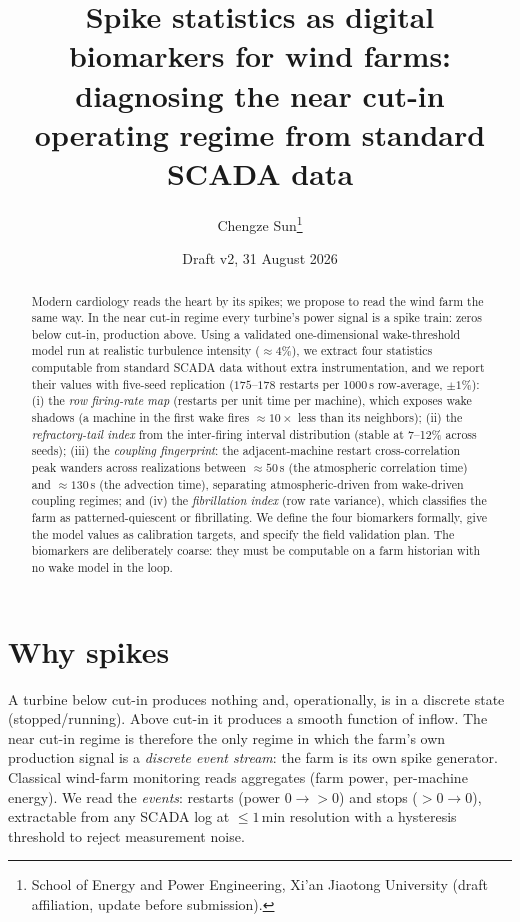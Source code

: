 \documentclass[11pt]{article}
\title{Spike statistics as digital biomarkers for wind farms:
diagnosing the near cut-in operating regime from standard SCADA data}
\author{Chengze Sun\thanks{School of Energy and Power Engineering, Xi'an Jiaotong University (draft affiliation, update before submission).}}
\date{Draft v2, 31 August 2026}
\begin{document}
\maketitle

\begin{abstract}
Modern cardiology reads the heart by its spikes; we propose to read the wind farm the same
way. In the near cut-in regime every turbine's power signal is a spike train: zeros below
cut-in, production above. Using a validated one-dimensional wake-threshold model run at
realistic turbulence intensity ($\approx 4\%$), we extract four statistics computable from
standard SCADA data without extra instrumentation, and we report their values with
five-seed replication ($175$--$178$ restarts per 1000\,s row-average, $\pm 1\%$):
(i) the \emph{row firing-rate map} (restarts per unit time per machine), which exposes wake
shadows (a machine in the first wake fires $\approx 10\times$ less than its neighbors);
(ii) the \emph{refractory-tail index} from the inter-firing interval distribution (stable
at 7--12\% across seeds); (iii) the \emph{coupling fingerprint}: the adjacent-machine restart
cross-correlation peak wanders across realizations between $\approx 50$\,s (the atmospheric
correlation time) and $\approx 130$\,s (the advection time), separating atmospheric-driven
from wake-driven coupling regimes; and (iv) the \emph{fibrillation index} (row rate
variance), which classifies the farm as patterned-quiescent or fibrillating. We define the
four biomarkers formally, give the model values as calibration targets, and specify the
field validation plan. The biomarkers are deliberately coarse: they must be computable on a
farm historian with no wake model in the loop.
\end{abstract}

\section{Why spikes}

A turbine below cut-in produces nothing and, operationally, is in a discrete state
(stopped/running). Above cut-in it produces a smooth function of inflow. The near cut-in
regime is therefore the only regime in which the farm's own production signal is a
\emph{discrete event stream}: the farm is its own spike generator. Classical wind-farm
monitoring reads aggregates (farm power, per-machine energy). We read the \emph{events}:
restarts (power $0 \to >0$) and stops ($>0 \to 0$), extractable from any SCADA log at
$\le 1$\,min resolution with a hysteresis threshold to reject measurement noise.
\end{document}
